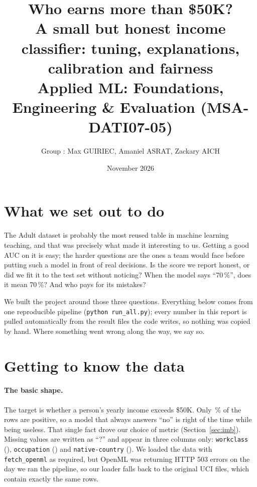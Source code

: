\documentclass[11pt,a4paper]{article}
\title{\textbf{Who earns more than \$50K?}\\[2pt]
\large A small but honest income classifier: tuning, explanations, calibration and fairness\\[4pt]
\normalsize Applied ML: Foundations, Engineering \& Evaluation (MSA-DATI07-05)}
\author{Group \GroupNb{}: Max GUIRIEC, Amaniel ASRAT, Zackary AICH}
\date{November 2026}
\begin{document}
\maketitle
\vspace{-1.4em}
\begin{center}
\end{center}

\section*{What we set out to do}
The Adult dataset is probably the most reused table in machine learning teaching, and that was precisely what made it interesting to us. Getting a good AUC on it is easy; the harder questions are the ones a team would face before putting such a model in front of real decisions. Is the score we report honest, or did we fit it to the test set without noticing? When the model says ``70\,\%'', does it mean 70\,\%? And who pays for its mistakes?

We built the project around those three questions. Everything below comes from one reproducible pipeline (\texttt{python run\_all.py}); every number in this report is pulled automatically from the result files the code writes, so nothing was copied by hand. Where something went wrong along the way, we say so.

\section{Getting to know the data}
\paragraph{The basic shape.} The target is whether a person's yearly income exceeds \$50K. Only \PosRate\,\% of the \NRows{} rows are positive, so a model that always answers ``no'' is right \BaseAcc{} of the time while being useless. That single fact drove our choice of metric (Section~\ref{sec:imb}). Missing values are written as ``?'' and appear in three columns only: \texttt{workclass} (\MissWork), \texttt{occupation} (\MissOcc) and \texttt{native-country} (\MissCountry). We loaded the data with \texttt{fetch\_openml} as required, but OpenML was returning HTTP 503 errors on the day we ran the pipeline, so our loader falls back to the original UCI files, which contain exactly the same \NRows{} rows.
\end{document}
